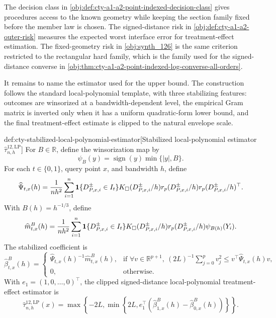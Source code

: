 The decision class  in \cref{obj:def:cty-a1-a2-point-indexed-decision-class} gives procedures access to the known geometry while keeping the section family fixed before the member law is chosen. The signed-distance risk  in \cref{obj:def:cty-a1-a2-outer-risk} measures the expected worst interface error for treatment-effect estimation. The fixed-geometry risk in \cref{obj:synth_126} is the same criterion restricted to the rectangular hard family, which is the family used for the signed-distance converse in \cref{obj:thm:cty-a1-a2-point-indexed-log-converse-all-orders}.

It remains to name the estimator used for the upper bound. The construction follows the standard local-polynomial template, with three stabilizing features: outcomes are winsorized at a bandwidth-dependent level, the empirical Gram matrix is inverted only when it has a uniform quadratic-form lower bound, and the final treatment-effect estimate is clipped to the natural envelope scale.

\begin{definitionv}{def:cty-stabilized-local-polynomial-estimator}[Stabilized local-polynomial estimator \(\widehat\tau^{12,\mathrm{LP}}_{n,h}\)]
For \(B\in\mathbb R\), define the winsorization map by
\[
\psi_B(y)=\operatorname{sign}(y)\min\{|y|,B\}.
\]
For each \(t\in\{0,1\}\), query point \(x\), and bandwidth \(h\), define
\[
\widehat\Psi_{t,x}(h)
 =
 {1\over nh^2}\sum_{i=1}^n
 \mathbf 1\{D^{\pm}_{P,x,i}\in I_t\}K_\square(D^{\pm}_{P,x,i}/h)
 r_p(D^{\pm}_{P,x,i}/h)r_p(D^{\pm}_{P,x,i}/h)^\top .
\]
With \(B(h)=h^{-1/3}\), define
\[
\widehat m^B_{t,x}(h)
 =
 {1\over nh^2}\sum_{i=1}^n
 \mathbf 1\{D^{\pm}_{P,x,i}\in I_t\}K_\square(D^{\pm}_{P,x,i}/h)
 r_p(D^{\pm}_{P,x,i}/h)\psi_{B(h)}(Y_i).
\]
The stabilized coefficient is
\[
\widehat\beta^B_{t,x}(h)
 =
 \begin{cases}
 \widehat\Psi_{t,x}(h)^{-1}\widehat m^B_{t,x}(h),
 & \text{if }\forall v\in\mathbb R^{p+1},\ (2L)^{-1}\sum_{j=0}^p v_j^2\leq v^\top\widehat\Psi_{t,x}(h)v,\\
 0,
 & \text{otherwise.}
 \end{cases}
\]
With \(e_1=(1,0,\ldots,0)^\top\), the clipped signed-distance local-polynomial treatment-effect estimator is
\[
\widehat\tau^{12,\mathrm{LP}}_{n,h}(x)
 =
 \max\!\left\{-2L,\min\!\left\{2L,
 e_1^\top(\widehat\beta^B_{1,x}(h)-\widehat\beta^B_{0,x}(h))
 \right\}\right\}.
\]
\end{definitionv}


